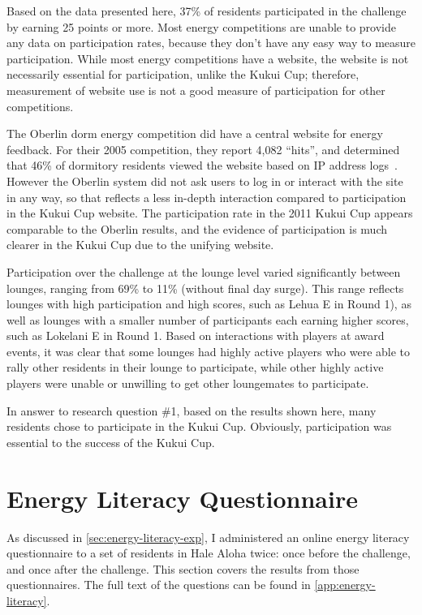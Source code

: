Based on the data presented here, 37\% of residents participated in the challenge by earning 25 points or more. Most energy competitions are unable to provide any data on participation rates, because they don't have any easy way to measure participation. While most energy competitions have a website, the website is not necessarily essential for participation, unlike the Kukui Cup; therefore, measurement of website use is not a good measure of participation for other competitions.

The Oberlin dorm energy competition did have a central website for energy feedback. For their 2005 competition, they report 4,082 ``hits'', and determined that 46\% of dormitory residents viewed the website based on IP address logs~\cite{petersen-dorm-energy-reduction}. However the Oberlin system did not ask users to log in or interact with the site in any way, so that reflects a less in-depth interaction compared to participation in the Kukui Cup website. The participation rate in the 2011 Kukui Cup appears comparable to the Oberlin results, and the evidence of participation is much clearer in the Kukui Cup due to the unifying website.

Participation over the challenge at the lounge level varied significantly between lounges, ranging from 69\% to 11\% (without final day surge). This range reflects lounges with high participation and high scores, such as Lehua E in Round 1), as well as lounges with a smaller number of participants each earning higher scores, such as Lokelani E in Round 1. Based on interactions with players at award events, it was clear that some lounges had highly active players who were able to rally other residents in their lounge to participate, while other highly active players were unable or unwilling to get other loungemates to participate.

In answer to research question \#1, based on the results shown here, many residents chose to participate in the Kukui Cup. Obviously, participation was essential to the success of the Kukui Cup.


\section{Energy Literacy Questionnaire}
\label{sec:energy-lit-results}

As discussed in \autoref{sec:energy-literacy-exp}, I administered an online energy literacy questionnaire to a set of residents in Hale Aloha twice: once before the challenge, and once after the challenge. This section covers the results from those questionnaires. The full text of the questions can be found in \autoref{app:energy-literacy}.

